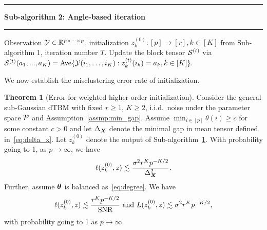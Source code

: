 \documentclass[journal]{IEEEtran}
\theoremstyle{definition}
\newtheorem{thm}{Theorem}
\theoremstyle{definition}
\newcommand\Algphase[1]{%
\vspace*{-.7\baselineskip}\Statex\hspace*{\dimexpr-\algorithmicindent-2pt\relax}\rule{\textwidth}{0.4pt}%
\Statex\hspace*{-\algorithmicindent}\textbf{#1}%
\vspace*{-.7\baselineskip}\Statex\hspace*{\dimexpr-\algorithmicindent-2pt\relax}\rule{\textwidth}{0.4pt}%
}
\begin{document}
\begin{algorithm*}[th!]
\begin{algorithmic}[1]
\Algphase{Sub-algorithm 2: Angle-based iteration}\label{alg:2}
\INPUT Observation $\mathcal{Y} \in \mathbb{R}^{p \times \cdots \times p}$, initialization $z^{(0)}_k \colon [p]\to[r], k \in [K]$ from Sub-algorithm 1, iteration number $T$.
\State Update the block tensor $\mathcal{S}^{(t)}$ via
$\mathcal{S}^{(t)} (a_1,...,a_K)= \text{Ave} \{\mathcal{Y}(i_1,\ldots,i_K): z^{(t)}_k(i_k) = a_k, k \in [K]\}.$


\EndFor
\EndFor


\end{algorithmic}
\end{algorithm*}

We now establish the misclustering error rate of initialization.

\begin{thm}[Error for weighted higher-order initialization]\label{thm:initial} Consider the general sub-Gaussian dTBM with {fixed $r \geq 1$, $K \geq 2$}, i.i.d.\ noise under the parameter space $\mathcal{P}$ and Assumption~\ref{assmp:min_gap}. Assume $\min_{i\in[p]}\theta(i) \geq c$ for some constant $c>0$ and let $\Delta_{\bm X}$ denote the minimal gap in mean tensor defined in~\eqref{eq:delta_x}.  Let $ z^{(0)}_k$ denote the output of Sub-algorithm~\hyperref[alg:main]{1}. With probability going to 1, {as $p \rightarrow \infty$}, we have
\begin{equation}
    \ell(z^{(0)}_k, z) \lesssim {\sigma^2 r^K p^{-K/2}\over \Delta_{\bm X}^2}.
\end{equation}
Further, assume $\boldsymbol{\theta}$ is balanced as~\eqref{eq:degree}. We have
\begin{equation}\label{eq:ini}
 \ell(z_k^{(0)}, z) \lesssim {r^K p^{-K/2}\over \text{SNR}} \  \text{and} \ L(z^{(0)}_k, z) \lesssim  {\sigma^2 r^K p^{-K/2}},
\end{equation}
{with probability going to 1 as $p \rightarrow \infty$.}
\end{thm}
\end{document}
